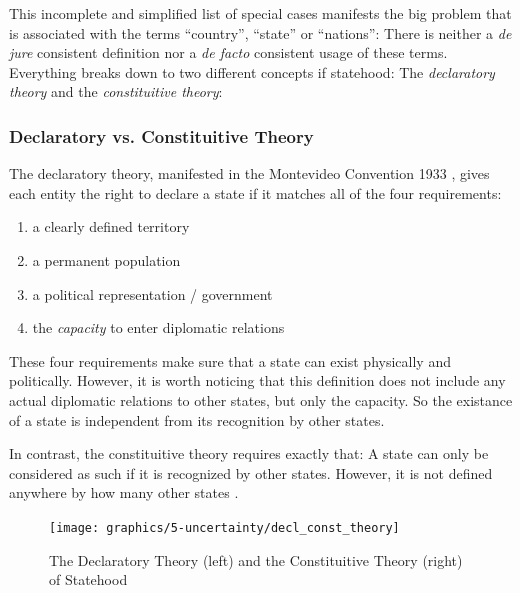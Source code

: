 

This incomplete and simplified list of special cases manifests the big problem that is associated with the terms ``country'', ``state'' or ``nations'': There is neither a \emph{de jure} consistent definition nor a \emph{de facto} consistent usage of these terms. Everything breaks down to two different concepts if statehood: The \emph{declaratory theory} and the \emph{constituitive theory}:



\subsubsection{Declaratory vs. Constituitive Theory} %
\label{ssub:declaratory_vs_constituitive_theory}

The declaratory theory, manifested in the Montevideo Convention 1933 \cite{MontevideoConvention}, gives each entity the right to declare a state if it matches all of the four requirements:
\begin{enumerate}
  \item a clearly defined territory
  \item a permanent population
  \item a political representation / government
  \item the \emph{capacity} to enter diplomatic relations
\end{enumerate}

These four requirements make sure that a state can exist physically and politically. However, it is worth noticing that this definition does not include any actual diplomatic relations to other states, but only the capacity. So the existance of a state is independent from its recognition by other states.

In contrast, the constituitive theory requires exactly that: A state can only be considered as such if it is recognized by other states. However, it is not defined anywhere by how many other states \cite{StateTheory}.

\begin{figure}[ht]
  \centering
  \texttt{[image: graphics/5-uncertainty/decl\_const\_theory]}
  \caption{The Declaratory Theory (left) and the Constituitive Theory (right) of Statehood}
  \label{fig:declaratory_constituitive_theory}
\end{figure}

